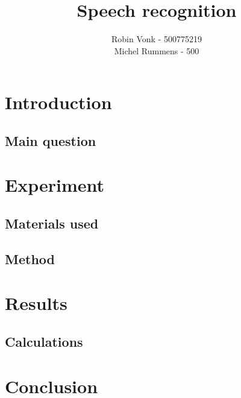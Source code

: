 \documentclass{article}
\title{Speech recognition}
\date{}
\author{
		Robin Vonk - 500775219 \\
		Michel Rummens - 500 \\
		}
\begin{document}
\maketitle
\tableofcontents

\section{Introduction}
\subsection{Main question}

\section{Experiment}
\subsection{Materials used}
\subsection{Method}

\section{Results}
\subsection{Calculations}

\section{Conclusion}
\end{document}
